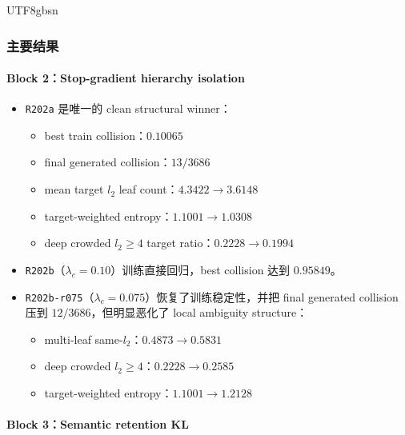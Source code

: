 \documentclass[11pt]{article}
\begin{document}
\begin{CJK*}{UTF8}{gbsn}
\subsubsection*{主要结果}

\paragraph{Block 2：Stop-gradient hierarchy isolation}

\begin{itemize}
  \item \texttt{R202a} 是唯一的 clean structural winner：
  \begin{itemize}
    \item best train collision：\(0.10065\)
    \item final generated collision：\(13/3686\)
    \item mean target \(l_2\) leaf count：\(4.3422 \rightarrow 3.6148\)
    \item target-weighted entropy：\(1.1001 \rightarrow 1.0308\)
    \item deep crowded \(l_2 \ge 4\) target ratio：\(0.2228 \rightarrow 0.1994\)
  \end{itemize}
  \item \texttt{R202b}（\(\lambda_c = 0.10\)）训练直接回归，best collision 达到 \(0.95849\)。
  \item \texttt{R202b-r075}（\(\lambda_c = 0.075\)）恢复了训练稳定性，并把 final generated collision 压到 \(12/3686\)，但明显恶化了 local ambiguity structure：
  \begin{itemize}
    \item multi-leaf same-\(l_2\)：\(0.4873 \rightarrow 0.5831\)
    \item deep crowded \(l_2 \ge 4\)：\(0.2228 \rightarrow 0.2585\)
    \item target-weighted entropy：\(1.1001 \rightarrow 1.2128\)
  \end{itemize}
\end{itemize}

\paragraph{Block 3：Semantic retention KL}


\end{CJK*}
\end{document}

